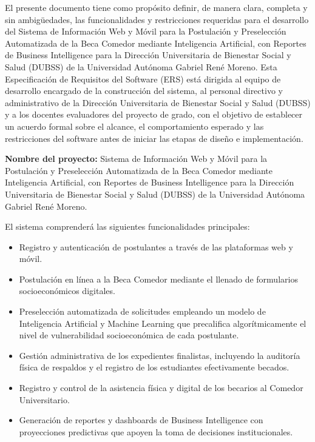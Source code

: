 \label{sec:ieee_introduccion}

\label{sec:ieee_proposito}

El presente documento tiene como propósito definir, de manera clara, completa y sin ambigüedades, las funcionalidades y restricciones requeridas para el desarrollo del Sistema de Información Web y Móvil para la Postulación y Preselección Automatizada de la Beca Comedor mediante Inteligencia Artificial, con Reportes de Business Intelligence para la Dirección Universitaria de Bienestar Social y Salud (DUBSS) de la Universidad Autónoma Gabriel René Moreno. Esta Especificación de Requisitos del Software (ERS) está dirigida al equipo de desarrollo encargado de la construcción del sistema, al personal directivo y administrativo de la Dirección Universitaria de Bienestar Social y Salud (DUBSS) y a los docentes evaluadores del proyecto de grado, con el objetivo de establecer un acuerdo formal sobre el alcance, el comportamiento esperado y las restricciones del software antes de iniciar las etapas de diseño e implementación.

\label{sec:ieee_ambito}

\textbf{Nombre del proyecto:} Sistema de Información Web y Móvil para la Postulación y Preselección Automatizada de la Beca Comedor mediante Inteligencia Artificial, con Reportes de Business Intelligence para la Dirección Universitaria de Bienestar Social y Salud (DUBSS) de la Universidad Autónoma Gabriel René Moreno.

El sistema comprenderá las siguientes funcionalidades principales:

\begin{itemize}
    \item Registro y autenticación de postulantes a través de las plataformas web y móvil.
    \item Postulación en línea a la Beca Comedor mediante el llenado de formularios socioeconómicos digitales.
    \item Preselección automatizada de solicitudes empleando un modelo de Inteligencia Artificial y Machine Learning que precalifica algorítmicamente el nivel de vulnerabilidad socioeconómica de cada postulante.
    \item Gestión administrativa de los expedientes finalistas, incluyendo la auditoría física de respaldos y el registro de los estudiantes efectivamente becados.
    \item Registro y control de la asistencia física y digital de los becarios al Comedor Universitario.
    \item Generación de reportes y dashboards de Business Intelligence con proyecciones predictivas que apoyen la toma de decisiones institucionales.
\end{itemize}

